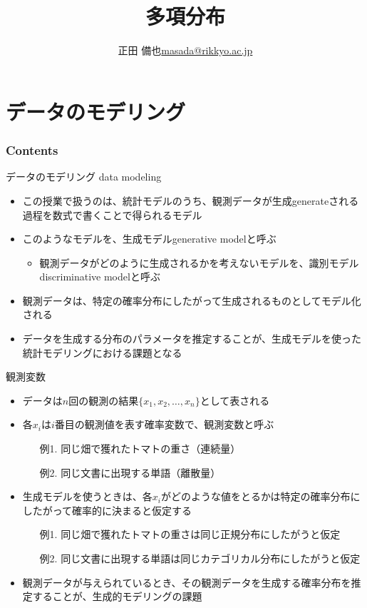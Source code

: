 \documentclass[aspectratio=169,unicode,dvipdfmx,14pt]{beamer}
\title{ \\多項分布}
\author{\texorpdfstring{正田 備也\newline\href{mailto:masada@rikkyo.ac.jp}{masada@rikkyo.ac.jp}}{正田 備也}}
\date{}
\begin{document}
\begin{frame}
\titlepage
\end{frame}

\section{データのモデリング}

\begin{frame}\frametitle{Contents}
\Large \tableofcontents[currentsection]
\end{frame}

\begin{frame}{データのモデリング data modeling}
\begin{itemize}
\item この授業で扱うのは、統計モデルのうち、観測データが生成generateされる過程を数式で書くことで得られるモデル
\item このようなモデルを、生成モデルgenerative modelと呼ぶ
\begin{itemize}
\item 観測データがどのように生成されるかを考えないモデルを、識別モデルdiscriminative modelと呼ぶ
\end{itemize}
\item 観測データは、特定の確率分布にしたがって生成されるものとしてモデル化される
\item データを生成する分布のパラメータを推定することが、生成モデルを使った統計モデリングにおける課題となる
\end{itemize}
\end{frame}

\begin{frame}{観測変数}
\begin{itemize}
\item データは$n$回の観測の結果$\{x_1,x_2,\ldots,x_n\}$として表される
\item 各$x_i$は$i$番目の観測値を表す確率変数で、観測変数と呼ぶ
\begin{itemize}
\item[例1.] 同じ畑で獲れたトマトの重さ（連続量）
\item[例2.] 同じ文書に出現する単語（離散量）
\end{itemize}
\item 生成モデルを使うときは、各$x_i$がどのような値をとるかは特定の確率分布にしたがって確率的に決まると仮定する
\begin{itemize}
\item[例1.] 同じ畑で獲れたトマトの重さは同じ正規分布にしたがうと仮定
\item[例2.] 同じ文書に出現する単語は同じカテゴリカル分布にしたがうと仮定
\end{itemize}
\item 観測データが与えられているとき、その観測データを生成する確率分布を推定することが、生成的モデリングの課題
\end{itemize}
\end{frame}
\end{document}
